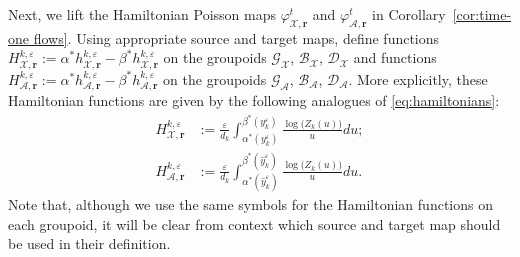 \documentclass{amsart}
\numberwithin{equation}{section}
\newcommand{\bfr}{{\boldsymbol{r}}}
\newcommand{\cA}{\mathcal{A}}
\newcommand{\cB}{\mathcal{B}}
\newcommand{\cD}{\mathcal{D}}
\newcommand{\cG}{\mathcal{G}}
\newcommand{\cX}{\mathcal{X}}
\begin{document}
Next, we lift the Hamiltonian Poisson maps $\varphi_{\cX,\bfr}^t$ and $\varphi_{\cA,\bfr}^t$ in Corollary~\ref{cor:time-one flows}. Using appropriate source and target maps, define functions $H_{\cX,\bfr}^{k,\varepsilon}:=\alpha^* h_{\cX,\bfr}^{k,\varepsilon}-\beta^* h_{\cX,\bfr}^{k,\varepsilon}$ on the groupoids $\cG_\cX$, $\cB_\cX$, $\cD_\cX$ and functions $H_{\cA,\bfr}^{k,\varepsilon}:=\alpha^* h_{\cA,\bfr}^{k,\varepsilon}-\beta^* h_{\cA,\bfr}^{k,\varepsilon}$ on the groupoids $\cG_\cA$, $\cB_\cA$, $\cD_\cA$.
More explicitly, these Hamiltonian functions are given by the following analogues of \eqref{eq:hamiltonians}:
\begin{align}
  \label{eq:X hamiltonian}
  H_{\cX,\bfr}^{k,\varepsilon}&:=\frac{\varepsilon}{d_k}\int_{\alpha^*(y_k^\varepsilon)}^{\beta^*(y_k^\varepsilon)} \frac{\log\big(Z_k(u)\big)}{u}du;\\
  \label{eq:A hamiltonian}
  H_{\cA,\bfr}^{k,\varepsilon}&:=\frac{\varepsilon}{d_k}\int_{\alpha^*(\hat y_k^\varepsilon)}^{\beta^*(\hat y_k^\varepsilon)} \frac{\log\big(Z_k(u)\big)}{u}du.
\end{align}
Note that, although we use the same symbols for the Hamiltonian functions on each groupoid, it will be clear from context which source and target map should be used in their definition.
\end{document}
